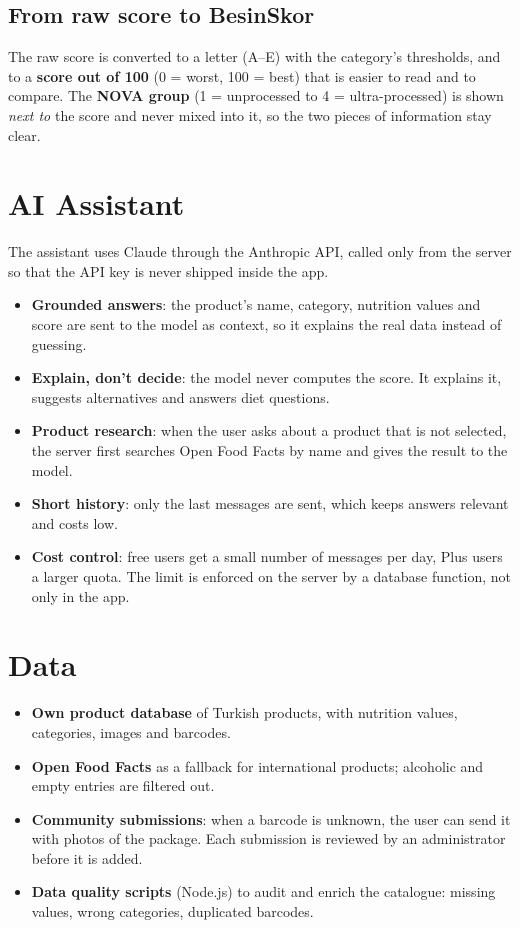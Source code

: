 \documentclass[a4paper,11pt]{article}
\begin{document}
\subsection*{From raw score to BesinSkor}
The raw score is converted to a letter (A--E) with the category's thresholds, and to a \textbf{score out of 100} (0 = worst, 100 = best) that is easier to read and to compare. The \textbf{NOVA group} (1 = unprocessed to 4 = ultra-processed) is shown \emph{next to} the score and never mixed into it, so the two pieces of information stay clear.

\section{AI Assistant}

The assistant uses Claude through the Anthropic API, called only from the server so that the API key is never shipped inside the app.

\begin{itemize}
  \item \textbf{Grounded answers}: the product's name, category, nutrition values and score are sent to the model as context, so it explains the real data instead of guessing.
  \item \textbf{Explain, don't decide}: the model never computes the score. It explains it, suggests alternatives and answers diet questions.
  \item \textbf{Product research}: when the user asks about a product that is not selected, the server first searches Open Food Facts by name and gives the result to the model.
  \item \textbf{Short history}: only the last messages are sent, which keeps answers relevant and costs low.
  \item \textbf{Cost control}: free users get a small number of messages per day, Plus users a larger quota. The limit is enforced on the server by a database function, not only in the app.
\end{itemize}

\section{Data}

\begin{itemize}
  \item \textbf{Own product database} of Turkish products, with nutrition values, categories, images and barcodes.
  \item \textbf{Open Food Facts} as a fallback for international products; alcoholic and empty entries are filtered out.
  \item \textbf{Community submissions}: when a barcode is unknown, the user can send it with photos of the package. Each submission is reviewed by an administrator before it is added.
  \item \textbf{Data quality scripts} (Node.js) to audit and enrich the catalogue: missing values, wrong categories, duplicated barcodes.
\end{itemize}
\end{document}
